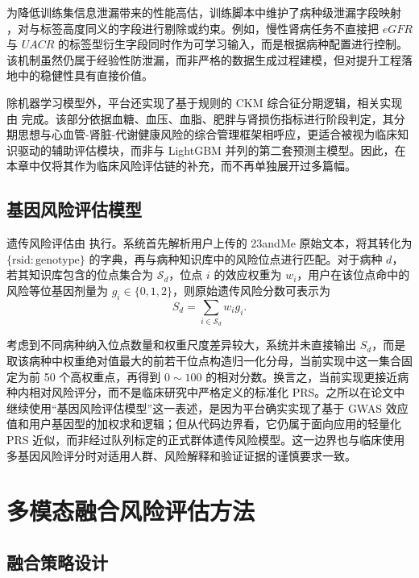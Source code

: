 为降低训练集信息泄漏带来的性能高估，训练脚本中维护了病种级泄漏字段映射 ，对与标签高度同义的字段进行剔除或约束。例如，慢性肾病任务不直接把 \(eGFR\) 与 \(UACR\) 的标签型衍生字段同时作为可学习输入，而是根据病种配置进行控制。该机制虽然仍属于经验性防泄漏，而非严格的数据生成过程建模，但对提升工程落地中的稳健性具有直接价值。

除机器学习模型外，平台还实现了基于规则的 CKM 综合征分期逻辑，相关实现由  完成。该部分依据血糖、血压、血脂、肥胖与肾损伤指标进行阶段判定，其分期思想与心血管-肾脏-代谢健康风险的综合管理框架相呼应\cite{ndumele2023ckm}，更适合被视为临床知识驱动的辅助评估模块，而非与 LightGBM 并列的第二套预测主模型。因此，在本章中仅将其作为临床风险评估链的补充，而不再单独展开过多篇幅。

\subsection{基因风险评估模型}

遗传风险评估由  执行。系统首先解析用户上传的 23andMe 原始文本，将其转化为 \(\{\text{rsid}: \text{genotype}\}\) 的字典，再与病种知识库中的风险位点进行匹配。对于病种 \(d\)，若其知识库包含的位点集合为 \(\mathcal{S}_d\)，位点 \(i\) 的效应权重为 \(w_i\)，用户在该位点命中的风险等位基因剂量为 \(g_i \in \{0,1,2\}\)，则原始遗传风险分数可表示为
\begin{equation}
S_d = \sum_{i \in \mathcal{S}_d} w_i g_i.
\end{equation}

考虑到不同病种纳入位点数量和权重尺度差异较大，系统并未直接输出 \(S_d\)，而是取该病种中权重绝对值最大的前若干位点构造归一化分母，当前实现中这一集合固定为前 50 个高权重点，再得到 \(0\sim100\) 的相对分数。换言之，当前实现更接近病种内相对风险评分，而不是临床研究中严格定义的标准化 PRS。之所以在论文中继续使用“基因风险评估模型”这一表述，是因为平台确实实现了基于 GWAS 效应值和用户基因型的加权求和逻辑；但从代码边界看，它仍属于面向应用的轻量化 PRS 近似，而非经过队列标定的正式群体遗传风险模型。这一边界也与临床使用多基因风险评分时对适用人群、风险解释和验证证据的谨慎要求一致\cite{icda2021prs}。

\section{多模态融合风险评估方法}

\subsection{融合策略设计}

